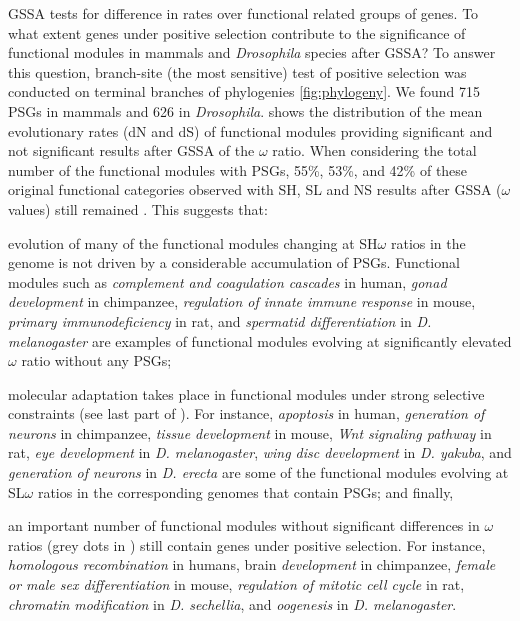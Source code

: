 GSSA tests for difference in rates over functional related groups of genes. To what extent genes under positive selection contribute to the significance of functional modules in mammals and \textit{Drosophila} species after GSSA? To answer this question, branch-site (the most sensitive) test of positive selection was conducted on terminal branches of phylogenies \ref{fig:phylogeny}{}. We found 715 PSGs in mammals and 626 in \textit{Drosophila}.  shows the distribution of the mean evolutionary rates (dN and dS) of functional modules providing significant and not significant results after GSSA of the $\omega$ ratio. When considering the total number of the functional modules with PSGs, 55\%, 53\%, and 42\% of these original functional categories observed with SH, SL and NS results after GSSA ($\omega$ values) still remained . This suggests that: \begin{inparaenum}[1\upshape-]\item evolution of many of the functional modules changing at SH$\omega$ ratios in the genome is not driven by a considerable accumulation of PSGs. Functional modules such as \textit{complement and coagulation cascades} in human, \textit{gonad development} in chimpanzee, \textit{regulation of innate immune response} in mouse, \textit{primary immunodeficiency} in rat, and \textit{spermatid differentiation} in \textit{D. melanogaster} are examples of functional modules evolving at significantly elevated $\omega$ ratio without any PSGs; \item molecular adaptation takes place in functional modules under strong selective constraints (see last part of ). For instance, \textit{apoptosis} in human, \textit{generation of neurons} in chimpanzee, \textit{tissue development} in mouse, \textit{Wnt signaling pathway} in rat, \textit{eye development} in \textit{D. melanogaster}, \textit{wing disc development} in \textit{D. yakuba}, and \textit{generation of neurons} in \textit{D. erecta} are some of the functional modules evolving at SL$\omega$ ratios in the corresponding genomes that contain PSGs; and finally, \item an important number of functional modules without significant differences in $\omega$ ratios (grey dots in ) still contain genes under positive selection. For instance, \textit{homologous recombination} in humans, brain \textit{development} in chimpanzee, \textit{female or male sex differentiation} in mouse, \textit{regulation of mitotic cell cycle} in rat, \textit{chromatin modification} in \textit{D. sechellia}, and \textit{oogenesis} in \textit{D. melanogaster}.\end{inparaenum} 

